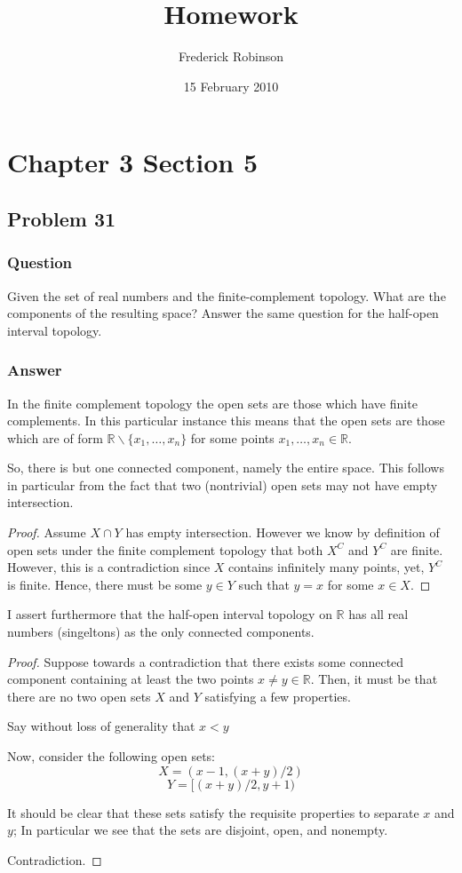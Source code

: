 \documentclass[10pt]{article}
\title{Homework}
\author{Frederick Robinson}
\date{15 February 2010}
\begin{document}

   \maketitle



\section{Chapter 3 Section 5}

\subsection{Problem 31}

\subsubsection{Question}
Given the set of real numbers and the finite-complement topology. What are the components of the resulting space? Answer the same question for the half-open interval topology.
\subsubsection{Answer}
In the finite complement topology the open sets are those which have finite complements. In this particular instance this means that the open sets are those which are of form $\mathbb{R} \backslash \{x_1,  \dots , x_n\}$ for some points $x_1, \dots, x_n \in \mathbb{R}$.

So, there is but one connected component, namely the entire space. This follows in particular from the fact that two (nontrivial) open sets may not have empty intersection. 

\begin{proof}
Assume $X \cap Y$ has empty intersection. However we know by definition of open sets under the finite complement topology that both $X^C$ and $Y^C$ are finite. However, this is a contradiction since $X$ contains infinitely many points, yet, $Y^C$ is finite. Hence, there must be some $y \in Y $ such that $y =x $ for some $x \in X$.
\end{proof}

I assert furthermore that the half-open interval topology on $\mathbb{R}$ has all real numbers (singeltons) as the only connected components.

\begin{proof}
Suppose towards a contradiction that there exists some connected component containing at least the two points $x \neq y \in \mathbb{R}$. Then, it must be that there are no two open sets $X$ and $Y$ satisfying a few properties.

Say without loss of generality that $x< y$ 

Now, consider the following open sets: 
\[X = (x-1,(x+y)/2)\]
\[Y=[(x+y)/2,y+1)\]

It should be clear that these sets satisfy the requisite properties to separate $x$ and $y$; In particular we see that the sets are disjoint, open, and nonempty.

 Contradiction.
\end{proof}
\end{document}
